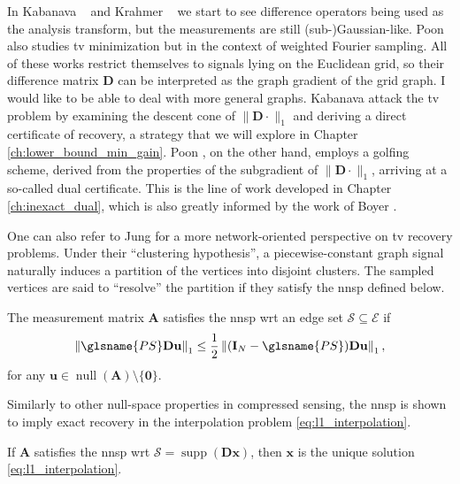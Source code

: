 In Kabanava \etal~\cite{kabanava2015a} and Krahmer \etal~\cite{krahmer2017} we start to see difference operators being used as the analysis transform, but the measurements are still (sub-)Gaussian-like. Poon \cite{poon2015} also studies \acrlong{tv} minimization but in the context of weighted Fourier sampling. All of these works restrict themselves to signals lying on the Euclidean grid, so their difference matrix $\mathbf{D}$ can be interpreted as the graph gradient of the grid graph. I would like to be able to deal with more general graphs. Kabanava \etal \cite{kabanava2015a} attack the \acrlong{tv} problem by examining the descent cone of $\|\mathbf{D} \cdot\|_1$ and deriving a direct certificate of recovery, a strategy that we will explore in Chapter \ref{ch:lower_bound_min_gain}. Poon \cite{poon2015}, on the other hand, employs a golfing scheme, derived from the properties of the subgradient of $\|\mathbf{D} \cdot\|_1$, arriving at a so-called dual certificate. This is the line of work developed in Chapter \ref{ch:inexact_dual}, which is also greatly informed by the work of Boyer \etal \cite{boyer2019}.

One can also refer to Jung \etal \cite{jung2016, jung2017, jung2018} for a more network-oriented perspective on \acrlong{tv} recovery problems. Under their ``clustering hypothesis'', a piecewise-constant graph signal naturally induces a partition of the vertices into disjoint clusters. The sampled vertices are said to ``resolve'' the partition if they satisfy the \acrlong{nnsp} defined below.

\begin{definition}
    The measurement matrix $\mathbf{A}$ satisfies the \acrshort{nnsp} \acrlong{wrt} an edge set $\mathcal{S} \subseteq \mathcal{E}$ if
    \begin{equation}
        \left \| \glsname{PS} \mathbf{D u} \right \|_1 \leq \frac{1}{2} \left \| (\mathbf{I}_N - \glsname{PS}) \mathbf{D u} \right \|_1,
    \end{equation}
    for any $\mathbf{u} \in \operatorname{null} \left ( \mathbf{A} \right ) \setminus \{ \mathbf{0} \}$.
\end{definition}

Similarly to other null-space properties in compressed sensing, the \acrshort{nnsp} is shown to imply exact recovery in the interpolation problem \eqref{eq:l1_interpolation}.

\begin{proposition}
    If $\mathbf{A}$ satisfies the \acrshort{nnsp} \acrshort{wrt} $\mathcal{S} = \operatorname{supp}\left ( \mathbf{D x} \right )$, then $\mathbf{x}$ is the unique solution \eqref{eq:l1_interpolation}.
\end{proposition}

